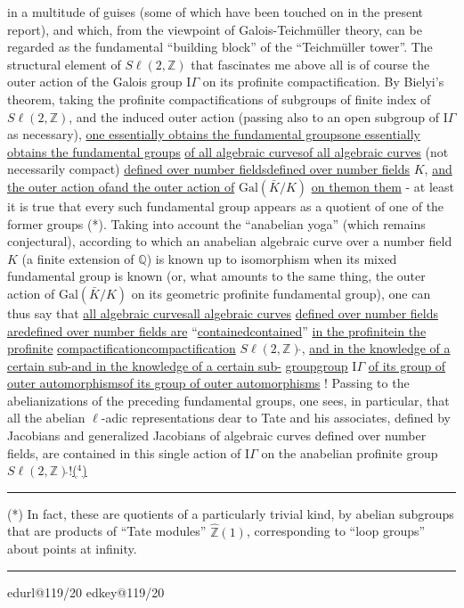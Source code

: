 \documentclass[11pt,a4paper]{article}
\makeatletter
\newif\ifreading
\newif\ifenglish
\def\CurrentScanURL{}
\def\CurrentPageKey{}
\def\CurrentApparatus{}
\newcommand{\scanpage}[1]{%
  \clearpage
  \expandafter\let\expandafter\CurrentScanURL\csname edurl@#1\endcsname
  \expandafter\let\expandafter\CurrentPageKey\csname edkey@#1\endcsname
  \def\CurrentApparatus{}%
  \hypertarget{scan-\CurrentPageKey}{}%
  \typeout{EDITION-SCAN: \CurrentPageKey; PDFPAGE: \the\numexpr\ReadonlyShipoutCounter+1\relax}%
  \ifreading
    \marginnote{\raggedright\scriptsize\sffamily\href{\CurrentScanURL}{119 / \csname edpage@#1\endcsname}}%
  \else
    \noindent{\small\sffamily\href{\CurrentScanURL}{[scan #1]}}\par\smallskip
  \fi}
\newcommand{\mspage}[1]{%
  \ifreading\marginnote{\raggedright\scriptsize\sffamily p.\,#1}[2\baselineskip]%
  \else\noindent{\small\sffamily[p.\,#1]}\par\smallskip\fi}
\let\TextUline\uline
\renewcommand{\uline}[1]{\ifmmode\underline{#1}\else\TextUline{#1}\fi}
\newcommand{\margin}[1]{%
  \sbox{\MarginalTestBox}{\parbox{\marginparwidth}{\raggedright\footnotesize#1}}%
  \ifdim\dimexpr\ht\MarginalTestBox+\dp\MarginalTestBox\relax>3\baselineskip
    \par\smallskip\noindent\begin{minipage}{\linewidth}\hrule\smallskip
    {\footnotesize\textcolor{HandInk}{\ifenglish Marginal note:\else Note marginale :\fi\ #1}}\smallskip\hrule\end{minipage}\par\smallskip
  \else
    \marginnote{\raggedright\footnotesize\textcolor{HandInk}{#1}}%
  \fi}
\newcommand{\finishscan}{\ifx\CurrentApparatus\empty\else\par\bigskip\noindent\rule{.35\linewidth}{.35pt}\par\smallskip{\footnotesize\setlength{\parskip}{3pt}\CurrentApparatus}\fi}
\newcommand{\notecall}[3]{\hypertarget{#2}{\hyperlink{note-#1}{#3}}}
\makeatother
\begin{document}
in a multitude of guises (some of which have been touched on
in the present report), and which, from the viewpoint of
Galois-Teichmüller theory, can be regarded as the fundamental
``building block'' of the ``Teichmüller tower''. The structural
element of $S\ell(2,\mathbb{Z})$ that fascinates me above all is of course
the outer action of the Galois group $\mathrm{I}\!\Gamma$ on its profinite
compactification. By Bielyi's theorem, taking the profinite
compactifications of subgroups of finite index of $S\ell(2,\mathbb{Z})$, and the induced
outer action (passing also to an open subgroup of $\mathrm{I}\!\Gamma$
as necessary), \uline{one essentially obtains the fundamental groups}
\uline{of all algebraic curves} (not necessarily compact)
\uline{defined over number fields} $K$, \uline{and the outer action of}
$\mathrm{Gal}(\bar{K}/K)$ \uline{on them} - at least it is true that every such fundamental
group appears as a quotient of one of the former groups (*).
Taking into account the ``anabelian yoga'' (which remains conjectural),
according to which an anabelian algebraic curve over a number field $K$
(a finite extension of $\mathbb{Q}$) is known up to isomorphism when
its mixed fundamental group is known (or, what amounts to the same thing,
the outer action of $\mathrm{Gal}(\bar{K}/K)$ on its geometric profinite
fundamental group), one can thus say that \uline{all algebraic curves}
\uline{defined over number fields are} ``\uline{contained}'' \uline{in the profinite}
\uline{compactification} $S\ell(2,\mathbb{Z})\hat{}$, \uline{and in the knowledge of a certain sub-}%
\uline{group} $\mathrm{I}\!\Gamma$ \uline{of its group of outer automorphisms} !
Passing to the abelianizations of the preceding fundamental groups, one sees,
in particular, that all the abelian $\ell$-adic representations dear
to Tate and his associates, defined by Jacobians and generalized
Jacobians of algebraic curves defined over number fields,
are contained in this single action of $\mathrm{I}\!\Gamma$ on the anabelian profinite
group $S\ell(2,\mathbb{Z})\hat{}$!\notecall{copy1-4}{call-esq_119_019-4-1}{($^{4}$)}

\rule{5cm}{0.4pt}

(*) In fact, these are quotients of a particularly trivial
kind, by abelian subgroups that are products of ``Tate modules''
$\hat{\mathbb{Z}}(1)$, corresponding to ``loop groups'' about points at infinity.

\margin{19}

\finishscan
\scanpage{119/20}
\mspage{18}
\end{document}
